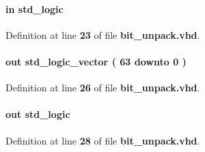 \paragraph[{data\+\_\+in\+\_\+valid}]{ {\bfseries \textcolor{keywordflow}{in}\textcolor{vhdlchar}{ }} {\bfseries \textcolor{comment}{std\+\_\+logic}\textcolor{vhdlchar}{ }} \hspace{0.3cm}{\ttfamily [Port]}}\label{classbit__unpack_a9fe0a9f38dccdb91d670106b4bbac6fd}


Definition at line {\bf 23} of file {\bf bit\+\_\+unpack.\+vhd}.

\paragraph[{data\+\_\+out}]{ {\bfseries \textcolor{keywordflow}{out}\textcolor{vhdlchar}{ }} {\bfseries \textcolor{comment}{std\+\_\+logic\+\_\+vector}\textcolor{vhdlchar}{ }\textcolor{vhdlchar}{(}\textcolor{vhdlchar}{ }\textcolor{vhdlchar}{ } \textcolor{vhdldigit}{63} \textcolor{vhdlchar}{ }\textcolor{keywordflow}{downto}\textcolor{vhdlchar}{ }\textcolor{vhdlchar}{ } \textcolor{vhdldigit}{0} \textcolor{vhdlchar}{ }\textcolor{vhdlchar}{)}\textcolor{vhdlchar}{ }} \hspace{0.3cm}{\ttfamily [Port]}}\label{classbit__unpack_a0fa91e9dfc077bf2f38bc5d8f13d0d4f}


Definition at line {\bf 26} of file {\bf bit\+\_\+unpack.\+vhd}.

\paragraph[{data\+\_\+out\+\_\+valid}]{ {\bfseries \textcolor{keywordflow}{out}\textcolor{vhdlchar}{ }} {\bfseries \textcolor{comment}{std\+\_\+logic}\textcolor{vhdlchar}{ }} \hspace{0.3cm}{\ttfamily [Port]}}\label{classbit__unpack_a465c1d9247590540abb6db12f657556f}


Definition at line {\bf 28} of file {\bf bit\+\_\+unpack.\+vhd}.

